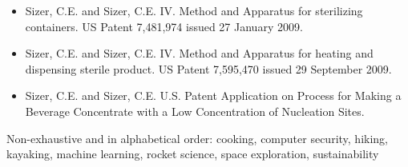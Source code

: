\documentclass[10pt,a4paper]{article} %
\begin{document}


\begin{itemize}
\item[] Sizer, C.E.  and Sizer, C.E. IV.  Method and Apparatus for sterilizing containers.   US Patent 7,481,974 issued 27 January 2009.
\item[] Sizer, C.E. and Sizer, C.E. IV.   Method and Apparatus for heating and dispensing sterile product.   US Patent 7,595,470 issued 29 September 2009.
\item[] Sizer, C.E. and Sizer, C.E. U.S. Patent Application on Process for Making a Beverage Concentrate with a Low Concentration of Nucleation Sites.
\end{itemize}




\inlineheadsection %
{Non-exhaustive and in alphabetical order:}
{cooking, computer security, hiking, kayaking, machine learning,  rocket science, space exploration, sustainability}
\end{document}
